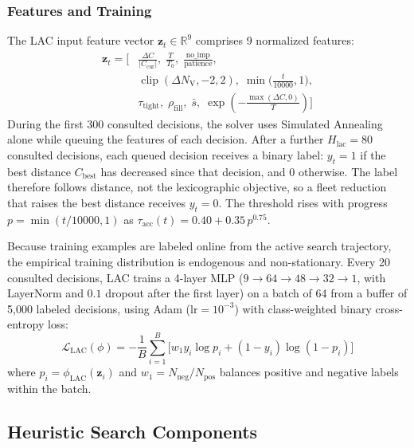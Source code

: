 \documentclass{ieeeaccess}
\newcommand{\NV}{{N_\mathrm{V}}}
\begin{document}
\subsubsection{Features and Training}
The LAC input feature vector $\mathbf{z}_t \in \mathbb{R}^9$ comprises 9 normalized features:
\begin{align}
  \mathbf{z}_t = \Big[
    &\frac{\Delta C}{|C_{\text{cur}}|}, \; \frac{T}{T_0}, \; \frac{\text{no\_imp}}{\text{patience}}, \nonumber \\
    &\operatorname{clip}(\Delta\NV, -2, 2), \; \min\Big(\frac{t}{10000}, 1\Big), \nonumber \\
    &\tau_{\text{tight}}, \; \rho_{\text{fill}}, \; \bar{s}, \; \exp\left(-\frac{\max(\Delta C, 0)}{T}\right) \Big]
  \label{eq:lac_features}
\end{align}
During the first 300 consulted decisions, the solver uses Simulated Annealing alone while queuing the features of each decision. After a further $H_{\text{lac}} = 80$ consulted decisions, each queued decision receives a binary label: $y_t = 1$ if the best distance $C_{\text{best}}$ has decreased since that decision, and $0$ otherwise. The label therefore follows distance, not the lexicographic objective, so a fleet reduction that raises the best distance receives $y_t = 0$. The threshold rises with progress $p = \min(t/10000, 1)$ as $\tau_{\text{acc}}(t) = 0.40 + 0.35\,p^{0.75}$.

Because training examples are labeled online from the active search trajectory, the empirical training distribution is endogenous and non-stationary. Every 20 consulted decisions, LAC trains a 4-layer MLP ($9 \to 64 \to 48 \to 32 \to 1$, with LayerNorm and $0.1$ dropout after the first layer) on a batch of 64 from a buffer of 5,000 labeled decisions, using Adam ($\text{lr} = 10^{-3}$) with class-weighted binary cross-entropy loss:
\begin{equation}
  \mathcal{L}_{\text{LAC}}(\phi) = -\frac{1}{B} \sum_{i=1}^B \Big[ w_1 y_i \log p_i + (1 - y_i) \log (1 - p_i) \Big]
  \label{eq:lac_loss}
\end{equation}
where $p_i = \phi_{\text{LAC}}(\mathbf{z}_i)$ and $w_1 = N_{\text{neg}} / N_{\text{pos}}$ balances positive and negative labels within the batch.

\subsection{Heuristic Search Components}
\label{sec:search_muscle}
\end{document}
